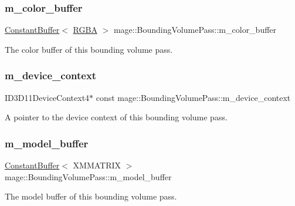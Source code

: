 \subsubsection{\texorpdfstring{m\+\_\+color\+\_\+buffer}{m\_color\_buffer}}
{\footnotesize\ttfamily \hyperlink{structmage_1_1_constant_buffer}{Constant\+Buffer}$<$ \hyperlink{structmage_1_1_r_g_b_a}{R\+G\+BA} $>$ mage\+::\+Bounding\+Volume\+Pass\+::m\+\_\+color\+\_\+buffer\hspace{0.3cm}{\ttfamily [private]}}

The color buffer of this bounding volume pass. \hypertarget{classmage_1_1_bounding_volume_pass_a4ee95284ca70becba75d4be1a19268d7}{}\label{classmage_1_1_bounding_volume_pass_a4ee95284ca70becba75d4be1a19268d7} 
\subsubsection{\texorpdfstring{m\+\_\+device\+\_\+context}{m\_device\_context}}
{\footnotesize\ttfamily I\+D3\+D11\+Device\+Context4$\ast$ const mage\+::\+Bounding\+Volume\+Pass\+::m\+\_\+device\+\_\+context\hspace{0.3cm}{\ttfamily [private]}}

A pointer to the device context of this bounding volume pass. \hypertarget{classmage_1_1_bounding_volume_pass_a07df0f32726f390dd0f060bc6d61b40e}{}\label{classmage_1_1_bounding_volume_pass_a07df0f32726f390dd0f060bc6d61b40e} 
\subsubsection{\texorpdfstring{m\+\_\+model\+\_\+buffer}{m\_model\_buffer}}
{\footnotesize\ttfamily \hyperlink{structmage_1_1_constant_buffer}{Constant\+Buffer}$<$ X\+M\+M\+A\+T\+R\+IX $>$ mage\+::\+Bounding\+Volume\+Pass\+::m\+\_\+model\+\_\+buffer\hspace{0.3cm}{\ttfamily [private]}}

The model buffer of this bounding volume pass. \hypertarget{classmage_1_1_bounding_volume_pass_a30c85c0e4766e4e330d906af2ecc7463}{}\label{classmage_1_1_bounding_volume_pass_a30c85c0e4766e4e330d906af2ecc7463} 
